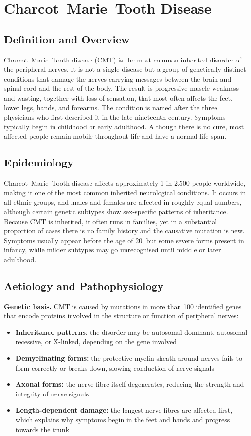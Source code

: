 \chapter{Charcot--Marie--Tooth Disease}

\section*{Definition and Overview}
Charcot--Marie--Tooth disease (CMT) is the most common inherited disorder of the peripheral nerves. It is not a single disease but a group of genetically distinct conditions that damage the nerves carrying messages between the brain and spinal cord and the rest of the body. The result is progressive muscle weakness and wasting, together with loss of sensation, that most often affects the feet, lower legs, hands, and forearms. The condition is named after the three physicians who first described it in the late nineteenth century. Symptoms typically begin in childhood or early adulthood. Although there is no cure, most affected people remain mobile throughout life and have a normal life span.

\section*{Epidemiology}
Charcot--Marie--Tooth disease affects approximately 1 in 2,500 people worldwide, making it one of the most common inherited neurological conditions. It occurs in all ethnic groups, and males and females are affected in roughly equal numbers, although certain genetic subtypes show sex-specific patterns of inheritance. Because CMT is inherited, it often runs in families, yet in a substantial proportion of cases there is no family history and the causative mutation is new. Symptoms usually appear before the age of 20, but some severe forms present in infancy, while milder subtypes may go unrecognised until middle or later adulthood.

\section*{Aetiology and Pathophysiology}
\medskip
\textbf{Genetic basis.} CMT is caused by mutations in more than 100 identified genes that encode proteins involved in the structure or function of peripheral nerves:
\begin{itemize}
    \item \textbf{Inheritance patterns:} the disorder may be autosomal dominant, autosomal recessive, or X-linked, depending on the gene involved
    \item \textbf{Demyelinating forms:} the protective myelin sheath around nerves fails to form correctly or breaks down, slowing conduction of nerve signals
    \item \textbf{Axonal forms:} the nerve fibre itself degenerates, reducing the strength and integrity of nerve signals
    \item \textbf{Length-dependent damage:} the longest nerve fibres are affected first, which explains why symptoms begin in the feet and hands and progress towards the trunk
\end{itemize}

